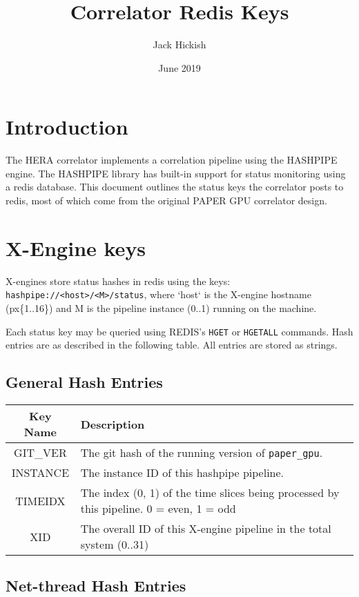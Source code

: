 \documentclass{article}
\title{Correlator Redis Keys}
\author{Jack Hickish}
\date{June 2019}
\begin{document}
\maketitle

\section{Introduction}
The HERA correlator implements a correlation pipeline using the HASHPIPE engine. The HASHPIPE library has built-in support for status monitoring using a redis database.
This document outlines the status keys the correlator posts to redis, most of which come from the original PAPER GPU correlator design.

\section{X-Engine keys}

X-engines store status hashes in redis using the keys: \texttt{hashpipe://<host>/<M>/status}, where `host` is the X-engine hostname (px\{1..16\}) and M is the pipeline instance (0..1) running on the machine.

Each status key may be queried using REDIS's \texttt{HGET} or \texttt{HGETALL} commands. Hash entries are as described in the following table. All entries are stored as strings.
\\
\subsection{General Hash Entries}

\begin{centering}
\begin{tabular}{c p{}}
\hline
Key Name & Description \\
\hline
\hline
GIT\_VER & The git hash of the running version of \texttt{paper\_gpu}. \\
INSTANCE & The instance ID of this hashpipe pipeline. \\
TIMEIDX  & The index (0, 1) of the time slices being processed by this pipeline. 0 = even, 1 = odd \\
XID      & The overall ID of this X-engine pipeline in the total system (0..31) \\
\end{tabular}
\end{centering}

\subsection{Net-thread Hash Entries}
\end{document}
